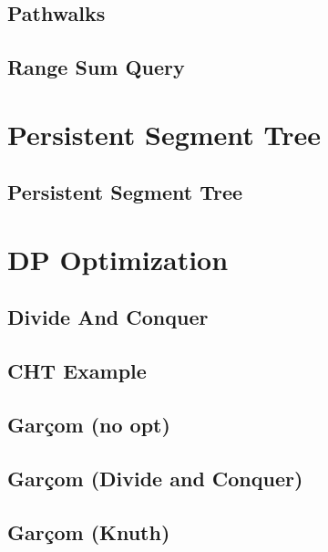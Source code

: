 \subsection{Pathwalks}
\raggedbottom
\hrulefill
\subsection{Range Sum Query}
\raggedbottom
\hrulefill

\section{Persistent Segment Tree}
\subsection{Persistent Segment Tree}
\raggedbottom
\hrulefill

\section{DP Optimization}
\subsection{Divide And Conquer}
\raggedbottom
\hrulefill
\subsection{CHT Example}
\raggedbottom
\hrulefill
\subsection{Garçom (no opt)}
\raggedbottom
\hrulefill
\subsection{Garçom (Divide and Conquer)}
\raggedbottom
\hrulefill
\subsection{Garçom (Knuth)}
\raggedbottom
\hrulefill
